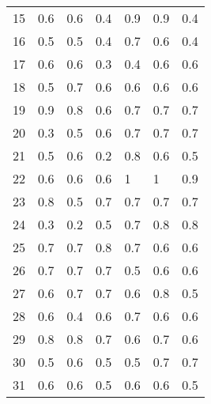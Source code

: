 \begin{table}[]
\begin{tabular}{l|lll|lll}
15              & 0.6                  & 0.6       & 0.4     & 0.9     & 0.9 & 0.4     \\
16              & 0.5                  & 0.5       & 0.4     & 0.7     & 0.6 & 0.4     \\
17              & 0.6                  & 0.6       & 0.3     & 0.4     & 0.6 & 0.6     \\
18              & 0.5                  & 0.7       & 0.6     & 0.6     & 0.6 & 0.6     \\
19              & 0.9                  & 0.8       & 0.6     & 0.7     & 0.7 & 0.7     \\
20              & 0.3                  & 0.5       & 0.6     & 0.7     & 0.7 & 0.7     \\
21              & 0.5                  & 0.6       & 0.2     & 0.8     & 0.6 & 0.5     \\
22              & 0.6                  & 0.6       & 0.6     & 1       & 1   & 0.9     \\
23              & 0.8                  & 0.5       & 0.7     & 0.7     & 0.7 & 0.7     \\
24              & 0.3                  & 0.2       & 0.5     & 0.7     & 0.8 & 0.8     \\
25              & 0.7                  & 0.7       & 0.8     & 0.7     & 0.6 & 0.6     \\
26              & 0.7                  & 0.7       & 0.7     & 0.5     & 0.6 & 0.6     \\
27              & 0.6                  & 0.7       & 0.7     & 0.6     & 0.8 & 0.5     \\
28              & 0.6                  & 0.4       & 0.6     & 0.7     & 0.6 & 0.6     \\
29              & 0.8                  & 0.8       & 0.7     & 0.6     & 0.7 & 0.6     \\
30              & 0.5                  & 0.6       & 0.5     & 0.5     & 0.7 & 0.7     \\
31              & 0.6                  & 0.6       & 0.5     & 0.6     & 0.6 & 0.5     \\
\end{tabular}
\end{table}
\clearpage
